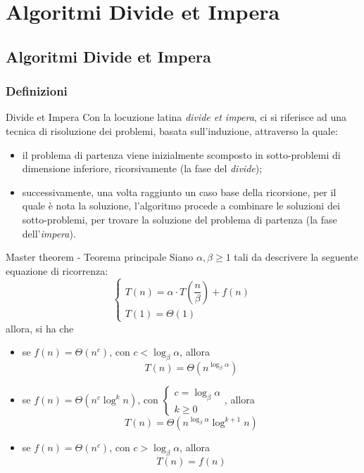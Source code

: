 \documentclass[a4paper, 12pt]{report}
\begin{document}
    \chapter{Algoritmi Divide et Impera}

    \section{Algoritmi Divide et Impera}

    \subsection{Definizioni}

    \begin{frameddefn}{Divide et Impera}
        Con la locuzione latina \textit{divide et impera}, ci si riferisce ad una tecnica di risoluzione dei problemi, basata sull'induzione, attraverso la quale:

        \begin{itemize} 
            \item il problema di partenza viene inizialmente scomposto in sotto-problemi di dimensione inferiore, ricorsivamente (la fase del \textit{divide});
            \item successivamente, una volta raggiunto un caso base della ricorsione, per il quale è nota la soluzione, l'algoritmo procede a combinare le soluzioni dei sotto-problemi, per trovare la soluzione del problema di partenza (la fase dell'\textit{impera}).
        \end{itemize}
    \end{frameddefn}

    \begin{framedthm}{Master theorem - Teorema principale}
        \label{master theorem}
        Siano $\alpha, \beta \ge 1$ tali da descrivere la seguente equazione di ricorrenza: $$\left \{ \begin{array}{l} T(n) = \alpha \cdot T\left(\dfrac{n}{\beta}\right) + f(n) \\ T(1) = \Theta(1) \end{array} \right.$$ allora, si ha che
        \begin{itemize}
            \item se $f(n) = \Theta(n^c)$, con $c < \log_{\beta}{\alpha}$, allora $$T(n) = \Theta(n^{\log_{\beta}{\alpha}})$$
            \item se $f(n) = \Theta(n^c \log^k n)$, con $\left \{ \begin{array}{l} c = \log_{\beta}{\alpha} \\ k \ge 0 \end{array} \right.$, allora $$T(n) = \Theta(n^{\log_{\beta}{\alpha}} \log^{k+1} {n})$$
            \item se $f(n) = \Theta(n^c)$, con $c > \log_{\beta}{\alpha}$, allora $$T(n) = f(n)$$
        \end{itemize}
    \end{framedthm}
\end{document}
